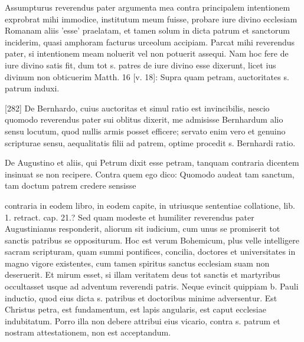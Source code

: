 Assumpturus reverendus pater argumenta mea contra principalem intentionem exprobrat mihi immodice, institutum meum fuisse, probare iure divino ecclesiam Romanam aliis 'esse' praelatam, et tamen solum in dicta patrum et sanctorum inciderim, quasi amphoram facturus urceolum accipiam. Parcat mihi reverendus pater, si intentionem meam noluerit vel non potuerit assequi. Nam hoc fere de iure divino satis fit, dum tot s. patres de iure divino esse dixerunt, licet ius divinum non obticuerim Matth. 16 [v. 18]: Supra quam petram, auctoritates s. patrum induxi.

[282] De Bernhardo, cuius auctoritas et simul ratio est invincibilis, nescio quomodo reverendus pater sui oblitus dixerit, me admisisse Bernhardum alio sensu locutum, quod nullis armis posset efficere; servato enim vero et genuino scripturae sensu, aequalitatis filii ad patrem, optime procedit s. Bernhardi ratio.

De Augustino et aliis, qui Petrum dixit esse petram, tanquam contraria dicentem insinuat se non recipere. Contra quem ego dico: Quomodo audeat tam sanctum, tam doctum patrem credere sensisse

contraria in eodem libro, in eodem capite, in utriusque sententiae collatione, lib. 1. retract. cap. 21.? Sed quam modeste et humiliter reverendus pater Augustinianus responderit, aliorum sit iudicium, cum unus se promiserit tot sanctis patribus se oppositurum. Hoc est verum Bohemicum, plus velle intelligere sacram scripturam, quam summi pontifices, concilia, doctores et universitates in magno vigore existentes, cum tamen spiritus sanctus ecclesiam suam non deseruerit. Et mirum esset, si illam veritatem deus tot sanctis et martyribus occultasset usque ad adventum reverendi patris. Neque evincit quippiam b. Pauli inductio, quod eius dicta s. patribus et doctoribus minime adversentur. Est Christus petra, est fundamentum, est lapis angularis, est caput ecclesiae indubitatum. Porro illa non debere attribui eius vicario, contra s. patrum et nostram attestationem, non est acceptandum.

